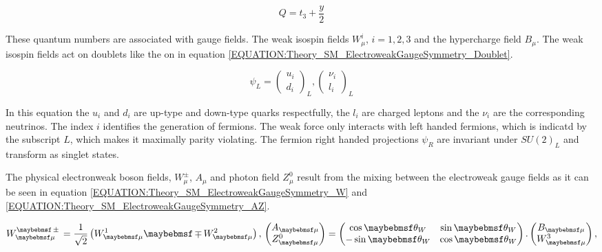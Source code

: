 \begin{equation}
Q = t_{3} + \frac{y}{2}
\label{EQUATION:Theory_SM_ElectroweakGaugeSymmetry_ElecCharge}
\end{equation}

These quantum numbers are associated with gauge fields. The weak isospin fields $W_{\mu}^{i}$, $i = 1,2,3$ and the hypercharge field $B_{\mu}$. The weak isospin fields act on doublets like the on in equation \ref{EQUATION:Theory_SM_ElectroweakGaugeSymmetry_Doublet}.
 
\begin{equation}
\psi_{L} =  \begin{pmatrix} u_{i} \\ d_{i} \end{pmatrix}_{L} ,   
\begin{pmatrix} \nu_{i} \\ {l_{i}} \end{pmatrix}_{L}
\label{EQUATION:Theory_SM_ElectroweakGaugeSymmetry_Doublet}
\end{equation}

In this equation the $u_{i}$ and $d_{i}$ are up-type and down-type quarks respectfully, the $l_{i}$ are charged leptons and the $\nu_{i}$ are the corresponding neutrinos. The index $i$ identifies the generation of fermions. The weak force only interacts with left handed fermions, which is indicatd by the subscript $L$, which makes it maximally parity violating. The fermion right handed projections $\psi_{R}$ are invariant under $SU(2)_{L}$ and transform as singlet states.
 
The physical electronweak boson fields, $W_{\mu}^{\pm}$, $A_{\mu}$ and photon field $Z_{\mu}^{0}$ result from the mixing between the electroweak gauge fields as it can be seen in equation \ref{EQUATION:Theory_SM_ElectroweakGaugeSymmetry_W} and \ref{EQUATION:Theory_SM_ElectroweakGaugeSymmetry_AZ}.


\begin{equation}
W_{\mu}^{\pm} = \frac{1}{\sqrt{2}}\left(W_{\mu}^{1} \mp W_{\mu}^{2}\right) ,\label{EQUATION:Theory_SM_ElectroweakGaugeSymmetry_W}\\
\begin{pmatrix} A_{\mu} \\ Z_{\mu}^{0} \end{pmatrix} = 
\begin{pmatrix} \cos{\theta_{W}} & \sin{\theta_{W}} \\ -\sin{\theta_{W}} &
\cos{\theta_{W}} \end{pmatrix} . 
\begin{pmatrix} B_{\mu} \\ W_{\mu}^{3} \end{pmatrix} ,
\label{EQUATION:Theory_SM_ElectroweakGaugeSymmetry_AZ}
\end{equation}

